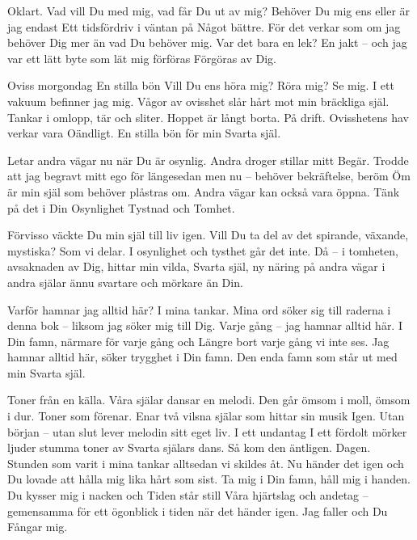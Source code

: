 \startpoem
Oklart.
Vad vill Du med mig,
vad får Du ut av mig?
Behöver Du mig ens eller är jag endast
Ett tidsfördriv i väntan på
Något bättre.
För det verkar som om jag behöver Dig mer
än vad Du behöver mig.
Var det bara en lek?
En jakt – och jag var ett lätt byte
som lät mig förföras
Förgöras 
av Dig.
\stoppoem

\startpoem
Oviss morgondag
En stilla bön
Vill Du ens höra mig?
Röra mig?
Se mig.
I ett vakuum befinner jag mig.
Vågor av ovisshet slår hårt mot
min bräckliga själ.
Tankar i omlopp,
tär och sliter.
Hoppet är långt borta.
På drift.
Ovisshetens hav verkar vara
Oändligt.
En stilla bön
för min Svarta själ.
\stoppoem

\startpoem
Letar andra vägar nu
när Du är osynlig.
Andra droger stillar mitt
Begär.
Trodde att jag begravt mitt ego
för längesedan men nu – 
behöver bekräftelse, beröm
Öm är min själ som behöver
plåstras om.
Andra vägar kan också vara öppna.
Tänk på det i Din
Osynlighet
Tystnad och
Tomhet.
\stoppoem

\startpoem
Förvisso väckte Du min själ till liv igen.
Vill Du ta del av det spirande, växande, mystiska?
Som vi delar.
I osynlighet och tysthet går det inte.
Då – i tomheten,
avsaknaden av Dig, hittar min vilda, Svarta själ,
ny näring på andra vägar
i andra själar
ännu svartare och mörkare än
Din.
\stoppoem

\startpoem
Varför hamnar jag alltid här?
I mina tankar. 
Mina ord söker sig till raderna i denna bok –
liksom jag söker mig till Dig.
Varje gång – jag hamnar alltid här.
I Din famn, närmare för varje gång och
Längre bort varje gång vi inte ses.
Jag hamnar alltid här,
söker trygghet i Din famn.
Den enda famn som står ut med min
Svarta själ.
\stoppoem

\startpoem
Toner från en källa.
Våra själar dansar en melodi.
Den går ömsom i moll, ömsom i dur.
Toner som förenar.
Enar två vilsna själar som hittar sin musik
Igen.
Utan början – utan slut
lever melodin sitt eget liv.
I ett undantag
I ett fördolt mörker ljuder stumma toner av
Svarta själars dans.
Så kom den äntligen.
Dagen. 
Stunden som varit i mina tankar alltsedan
vi skildes åt.
Nu händer det igen och Du lovade att 
hålla mig lika hårt som sist.
Ta mig i Din famn, håll mig i handen.
Du kysser mig i nacken och
Tiden står still
Våra hjärtslag och andetag – 
gemensamma för ett ögonblick i tiden
när det händer igen.
Jag faller och Du
Fångar mig.
\stoppoem


